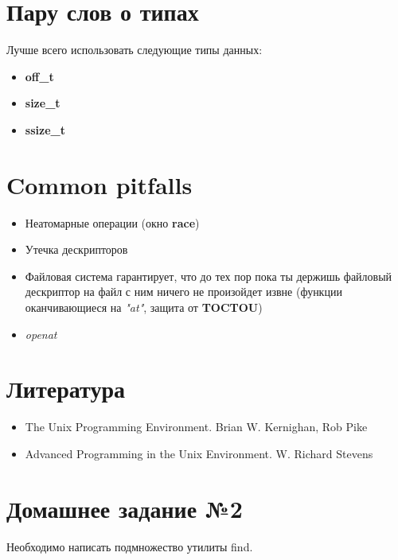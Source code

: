 \documentclass[../../lectures.tex]{subfiles}
\begin{document}
\section{Пару слов о типах}
Лучше всего использовать следующие типы данных:

\begin{itemize}
    \item \textbf{off\_t}
    \item \textbf{size\_t}
    \item \textbf{ssize\_t}
\end{itemize}


\section{Common pitfalls}
\begin{itemize}
    \item Неатомарные операции (окно \textbf{race})
    \item Утечка дескрипторов
    \item Файловая система гарантирует, что до тех пор пока 
          ты держишь файловый дескриптор на файл с ним ничего 
          не произойдет извне (функции оканчивающиеся на \emph{"at"}, 
          защита от \textbf{TOCTOU})
    \item \emph{openat}
\end{itemize}

\section{Литература}
\begin{itemize}
    \item The Unix Programming Environment. Brian W. Kernighan, Rob Pike
    \item Advanced Programming in the Unix Environment. W. Richard Stevens
\end{itemize}

\section{Домашнее задание №2}
Необходимо написать подмножество утилиты find.
\end{document}
